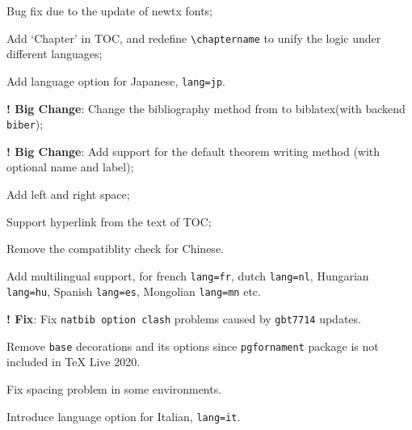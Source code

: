 \documentclass[11pt]{elegantbook}
\begin{document}

\begin{change}
  \item Bug fix due to the update of newtx fonts;
  \item Add `Chapter' in TOC, and redefine \lstinline{\chaptername} to unify the logic under different languages;
  \item Add language option for Japanese, \lstinline{lang=jp}.
\end{change}



\begin{change}
  \item \textbf{! Big Change}: Change the bibliography method from  to biblatex(with backend  \lstinline{biber});
  \item \textbf{! Big Change}: Add support for the default theorem writing method (with optional name and label);
  \item Add left and right space;
  \item Support hyperlink from the text of TOC;
  \item Remove the  compatiblity check for Chinese.
  \item Add multilingual support, for french \lstinline{lang=fr}, dutch \lstinline{lang=nl}, Hungarian  \lstinline{lang=hu}, Spanish \lstinline{lang=es}, Mongolian \lstinline{lang=mn} etc.
\end{change}



\begin{change}
  \item \textbf{! Fix}: Fix \lstinline{natbib option clash} problems caused by \lstinline{gbt7714} updates.
  \item Remove \lstinline{base} decorations and its options since \lstinline{pgfornament} package is not included in \TeX{} Live 2020.
  \item Fix spacing problem in some environments.
  \item Introduce language option for Italian, \lstinline{lang=it}.
\end{change}


\end{document}
